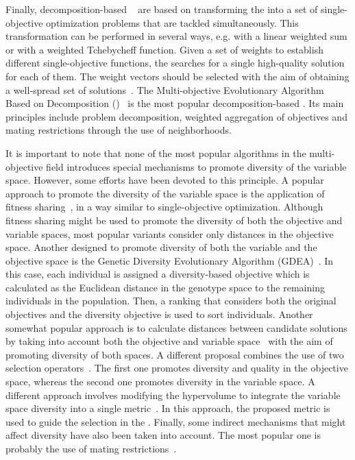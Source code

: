 Finally, decomposition-based \MOEAS{}~\cite{Joel:MOEAD_AMS} are based on transforming the \MOP{} into a set of 
single-objective optimization problems that are tackled simultaneously.
%
This transformation can be performed in several ways, e.g. with a linear weighted sum or with a weighted Tchebycheff function. 
%
Given a set of weights to establish different single-objective functions, the \MOEA{} searches for a single 
high-quality solution for each of them. 
%
The weight vectors should be selected with the aim of obtaining a well-spread set of solutions~\cite{Joel:Kalyanmoy}.
%
The Multi-objective Evolutionary Algorithm Based on Decomposition (\MOEAD{})~\cite{Joel:MOEAD} is the most popular 
decomposition-based \MOEA{}. 
%
Its main principles include problem decomposition, weighted aggregation of objectives and mating restrictions 
through the use of neighborhoods. 
 
It is important to note that none of the most popular algorithms in the multi-objective field introduces special 
mechanisms to promote diversity of the variable space.
%
However, some efforts have been devoted to this principle.
%
A popular approach to promote the diversity of the variable space is the application of fitness sharing~\cite{Joel:NPGA}, 
in a way similar to single-objective optimization.
%
Although fitness sharing might be used to promote the diversity of both the objective and variable spaces, most
popular variants consider only distances in the objective space.
%
Another \MOEA{} designed to promote diversity of both the variable and the objective space is the Genetic
Diversity Evolutionary Algorithm (GDEA)~\cite{toffolo2003genetic}.
%
In this case, each individual is assigned a diversity-based objective which is calculated as the
Euclidean distance in the genotype space to the remaining individuals in the population.
%
Then, a ranking that considers both the original objectives and the diversity objective is used
to sort individuals.
%
Another somewhat popular approach is to calculate distances between candidate solutions by taking
into account both the objective and variable space~\cite{deb2005omni,shir2009enhancing} with the aim
of promoting diversity of both spaces.
%
A different proposal combines the use of two selection operators~\cite{chan2005evolutionary}.
%
The first one promotes diversity and quality in the objective space, whereas the second one promotes diversity in the variable space.
%
A different approach involves modifying the hypervolume to integrate the variable space diversity 
into a single metric~\cite{ulrich2010integrating}.
%
In this approach, the proposed metric is used to guide the selection in the \MOEA{}.
%
Finally, some indirect mechanisms that might affect diversity have also been taken into account.
%
The most popular one is probably the use of mating restrictions~\cite{Joel:STUDY_MATTING_RESTRICTION,Joel:MOEAD_AMS}.

